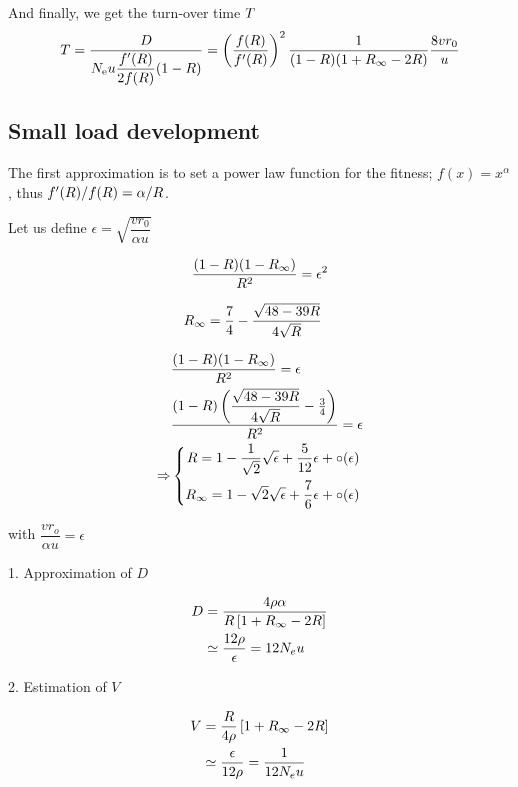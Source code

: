 \documentclass{article}
\begin{document}
And finally, we get the turn-over time $T$ 
\begin{equation}
  T = \dfrac{D}{N_\mathrm{e} u \dfrac{f'(R )}{2 f(R )} (1-R )}  =  \left( \dfrac{ f(R )}{f'(R )} \right)^2  \dfrac{1}{(1-R )( 1 + {R_{\infty}}  - 2 R   )}  \dfrac{8 v r_0}{u}
\end{equation}

\subsection*{Small load development}
The first approximation is to set a power law function for the fitness; $f(x)=x^{\alpha}$, thus $f'(R)/f(R)= \alpha / R$.

Let us define $\epsilon = \sqrt{\dfrac{v r_0}{\alpha u}}$

\begin{equation}
   \dfrac{(1- R )(1- {R_{\infty}} )}{R^2} =  \epsilon^2
\end{equation}

\begin{align}
    {R_{\infty}}  &=\frac{7}{4}-\frac{\sqrt{48-39  R}}{4 \sqrt{ R}}
\end{align}

\begin{align} 
    & \dfrac{(1- R )(1- {R_{\infty}} )}{R^2} =  \epsilon \\
    & \dfrac{(1- R )\left(\dfrac{\sqrt{48-39 R}}{4 \sqrt{R}} -\frac{3}{4}\right)}{R^2} =  \epsilon \\    
    \Rightarrow &
    \left\{
  \begin{aligned}
     R =  1 - \dfrac{1}{\sqrt{2}}\sqrt{\epsilon} + \dfrac{5}{12} \epsilon + \circ ( \epsilon)\\
     {R_{\infty}} =  1 - \sqrt{2} \sqrt{\epsilon} + \dfrac{7}{6} \epsilon + \circ ( \epsilon)\\
     \end{aligned}
  \right.
\end{align}

with $\dfrac{v r_o}{\alpha u} = \epsilon$


1. Approximation of $D$

\begin{align}
  D &= \dfrac{4\rho \alpha }{R \left[ 1 + {R_{\infty}}  - 2 R   \right]} \\
   & \simeq \dfrac{12 \rho}{\epsilon} = 12 N_e u
\end{align}

2. Estimation of $V$

\begin{align}
  V &= \dfrac{R }{4 \rho }\left[ 1 + {R_{\infty}}  - 2 R   \right] \\
   &\simeq \dfrac{\epsilon}{12 \rho} = \dfrac{1}{12 N_e u}
\end{align}
\end{document}
